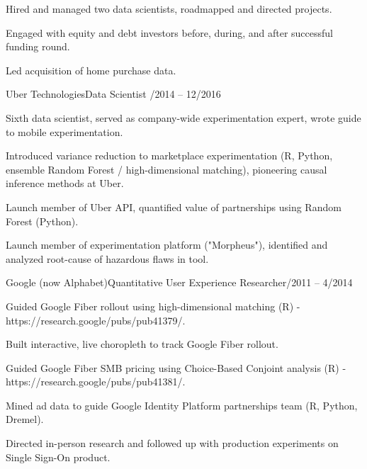 \documentclass[12pt]{res}
\begin{document}
{\begin{resume}
\begin{list}{}{\leftmargin=1em}
{\begin{list}{}{\leftmargin=1em}
\begin{list}{-}{\leftmargin=1em}
\item Hired and managed two data scientists, roadmapped and directed projects.
\item Engaged with equity and debt investors before, during, and after successful funding round.
\item Led acquisition of home purchase data.
\end{list}
\item Uber Technologies\dotfill Data Scientist /2014 -- 12/2016
\begin{list}{-}{\leftmargin=1em}
\item Sixth data scientist, served as company-wide experimentation expert, wrote guide to mobile experimentation.
\item Introduced variance reduction to marketplace experimentation (R, Python, ensemble Random Forest / high-dimensional matching), pioneering causal inference methods at Uber.
\item Launch member of Uber API, quantified value of partnerships using Random Forest (Python).
\item Launch member of experimentation platform ("Morpheus"), identified and analyzed root-cause of hazardous flaws in tool.
\end{list}
\item Google (now Alphabet)\dotfill Quantitative User Experience Researcher/2011 -- 4/2014
\begin{list}{-}{\leftmargin=1em}
\item Guided Google Fiber rollout using high-dimensional matching (R) -\\ https://research.google/pubs/pub41379/.
\item Built interactive, live choropleth to track Google Fiber rollout.
\item Guided Google Fiber SMB pricing using Choice-Based Conjoint analysis (R) -\\ https://research.google/pubs/pub41381/.
\item Mined ad data to guide Google Identity Platform partnerships team (R, Python, Dremel).
\item Directed in-person research and followed up with production experiments on Single Sign-On product.
\end{list}
\end{list}}
\item
\end{list}
\end{resume}
} %
\end{document}
